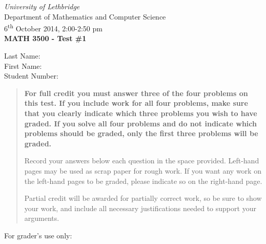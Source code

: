 \documentclass[12pt]{article}
\newcommand{\skipline}{\vspace{12pt}}
\begin{document}
\author{Instructor: Sean Fitzpatrick}
\thispagestyle{plain}
\begin{center}
\emph{University of Lethbridge}\\
Department of Mathematics and Computer Science\\
6\textsuperscript{th} October 2014, 2:00-2:50 pm\\
{\bf MATH 3500 - Test \#1}\\
\end{center}
\skipline \skipline \skipline \noindent \skipline
Last Name:\underline{\hspace{350pt}}\\
\skipline
First Name:\underline{\hspace{348pt}}\\
\skipline
Student Number:\underline{\hspace{322pt}}\\
\skipline

\vspace{0.5in}


\begin{quote}
{\bf For full credit you must answer three of the four problems on this test. If you include work for all four problems, make sure that you clearly indicate which three problems you wish to have graded. If you solve all four problems and do not indicate which problems should be graded, only the {\bf first three} problems will be graded.}

\bigskip
 
 {Record your answers below each question in the space provided.    Left-hand pages may be used as scrap paper for rough work.  If you want any work on the left-hand pages to be graded, please indicate so on the right-hand page.
 
 \bigskip
 
Partial credit will be awarded for partially correct work, so be sure to show your work, and include all necessary justifications needed to support your arguments. }

\end{quote}


\vspace{0.5in}

For grader's use only:
\end{document}
